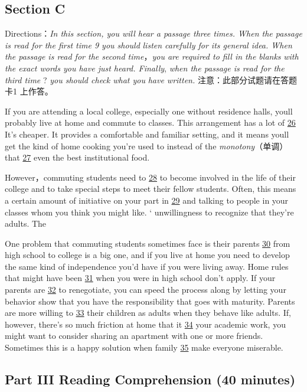 \documentclass[UTF8,11pt]{ctexart}
\begin{document}
\subsection*{\textbf{Section C}}


Directions：\textit{In this section, you will hear a passage three times. When the passage is read for the first time 9 you should} \textit{listen carefully for its general idea. When the passage is read for the second time}，\textit{you are required to fill in the blanks} \textit{with the exact words you have just heard. Finally},\textit{ when the passage is read for the third time} ?\textit{ you should check what you} \textit{have written.} 注意：此部分试题请在答题卡1 上作答。


If you are attending a local college, especially one without residence halls, youll probably live at home and commute to classes. This arrangement has a lot of \uline{26} It’s cheaper. It provides a comfortable and familiar setting, and it means youll get the kind of home cooking you’re used to instead of the\textit{ monotony}（单调）that \uline{27} even the best institutional food.


However，commuting students need to \uline{28} to become involved in the life of their college and to take special steps to meet their fellow students. Often, this means a certain amount of initiative on your part in \uline{29} and talking to people in your classes whom you think you might like. ‘ unwillingness to recognize that they’re adults. The


One problem that commuting students sometimes face is their parents \uline{30} from high school to college is a big one, and if you live at home you need to develop the same kind of independence you’d have if you were living away. Home rules that might have been \uline{31} when you were in high school don't apply. If your parents are \uline{32} to renegotiate, you can speed the process along by letting your behavior show that you have the responsibility that goes with maturity. Parents are more willing to \uline{33} their children as adults when they behave like adults. If, however, there’s so much friction at home that it \uline{34} your academic work, you might want to consider sharing an apartment with one or more friends. Sometimes this is a happy solution when family \uline{35} make everyone miserable.


\subsection*{\textbf{Part} III Reading Comprehension \textbf{(40 minutes)}}
\end{document}
